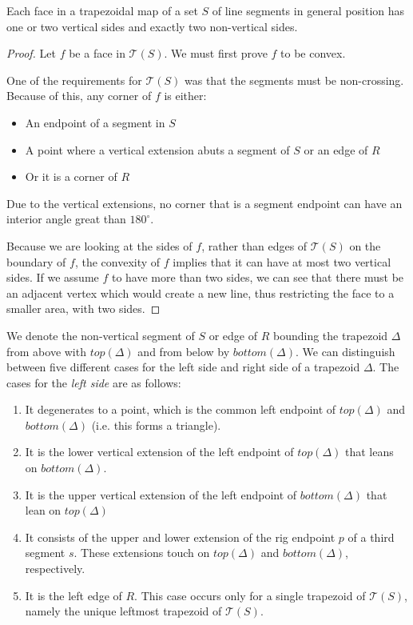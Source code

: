 \begin{lemma}
	Each face in a trapezoidal map of a set $S$ of line segments in general position has one or two vertical sides and exactly two non-vertical sides.
\end{lemma}

\begin{proof}
	Let $f$ be a face in $\mathcal{T}(S)$. We must first prove $f$ to be convex.

	One of the requirements for $\mathcal{T}(S)$ was that the segments must be non-crossing. Because of this, any corner of $f$ is either:
	\begin{itemize}
		\item An endpoint of a segment in $S$
		\item A point where a vertical extension abuts a segment of $S$ or an edge of $R$
		\item Or it is a corner of $R$
	\end{itemize}
	Due to the vertical extensions, no corner that is a segment endpoint can have an interior angle great than $180^{\circ}$.

	Because we are looking at the sides of $f$, rather than edges of $\mathcal{T}(S)$ on the boundary of $f$, the convexity of $f$ implies that it can have at most two vertical sides. If we assume $f$ to have more than two sides, we can see that there must be an adjacent vertex which would create a new line, thus restricting the face to a smaller area, with two sides.
\end{proof}

We denote the non-vertical segment of $S$ or edge of $R$ bounding the trapezoid \(\Delta\) from above with $top(\Delta)$ and from below by $bottom(\Delta)$. We can distinguish between five different cases for the left side and right side of a trapezoid \(\Delta\). The cases for the \textit{left side} are as follows:
\begin{enumerate}
	\item It degenerates to a point, which is the common left endpoint of $top(\Delta)$ and $bottom(\Delta)$ (i.e. this forms a triangle).
	\item It is the lower vertical extension of the left endpoint of $top(\Delta)$ that leans on $bottom(\Delta)$.
	\item It is the upper vertical extension of the left endpoint of $bottom(\Delta)$ that lean on $top(\Delta)$
	\item \label{deltap4}It consists of the upper and lower extension of the rig endpoint $p$ of a third segment $s$. These extensions touch on $top(\Delta)$ and $bottom(\Delta)$, respectively.
	\item It is the left edge of $R$. This case occurs only for a single trapezoid of $\mathcal{T}(S)$, namely the unique leftmost trapezoid of $\mathcal{T}(S)$.
\end{enumerate}

